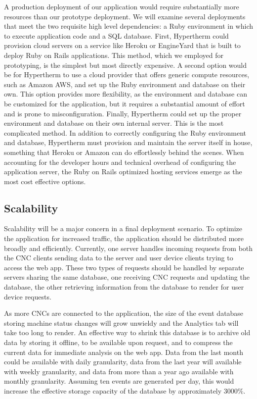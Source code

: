 \documentclass[12pt,letterpaper,titlepage]{article}
\begin{document}
A production deployment of our application would require substantially more resources than our prototype deployment. We will examine several deployments that meet the two requisite high level dependencies: a Ruby environment in which to execute application code and a SQL database. First, Hypertherm could provision cloud servers on a service like Heroku or EngineYard that is built to deploy Ruby on Rails applications. This method, which we employed for prototyping, is the simplest but most directly expensive. A second option would be for Hypertherm to use a cloud provider that offers generic compute resources, such as Amazon AWS, and set up the Ruby environment and database on their own. This option provides more flexibility, as the environment and database can be customized for the application, but it requires a substantial amount of effort and is prone to misconfiguration. Finally, Hypertherm could set up the proper environment and database on their own internal server. This is the most complicated method. In addition to correctly configuring the Ruby environment and database, Hypertherm must provision and maintain the server itself in house, something that Heroku or Amazon can do effortlessly behind the scenes. When accounting for the developer hours and technical overhead of configuring the application server, the Ruby on Rails optimized hosting services emerge as the most cost effective options.

\subsection{Scalability} \label{sec:Scalability}

Scalability will be a major concern in a final deployment scenario. To optimize the application for increased traffic, the application should be distributed more broadly and efficiently. Currently, one server handles incoming requests from both the CNC clients sending data to the server and user device clients trying to access the web app. These two types of requests should be handled by separate servers sharing the same database, one receiving CNC requests and updating the database, the other retrieving information from the database to render for user device requests.

As more CNCs are connected to the application, the size of the event database storing machine status changes will grow unwieldy and the Analytics tab will take too long to render. An effective way to shrink this database is to archive old data by storing it offline, to be available upon request, and to compress the current data for immediate analysis on the web app. Data from the last month could be available with daily granularity, data from the last year will available with weekly granularity, and data from more than a year ago available with monthly granularity. Assuming ten events are generated per day, this would increase the effective storage capacity of the database by approximately 3000\%.
\end{document}
